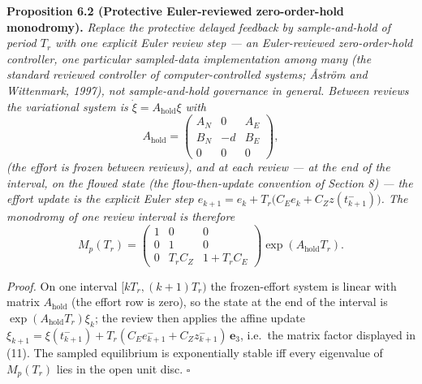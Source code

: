 \documentclass[11pt]{article}
\begin{document}
\textbf{Proposition 6.2 (Protective Euler-reviewed zero-order-hold
monodromy).} \emph{Replace the protective delayed feedback by
sample-and-hold of period \(T_r\) with one explicit Euler review step
--- an Euler-reviewed zero-order-hold controller, one particular
sampled-data implementation among many (the standard reviewed controller
of computer-controlled systems; \AA{}str\"om and Wittenmark, 1997), not
sample-and-hold governance in general. Between reviews the variational
system is \(\dot\xi = A_{\mathrm{hold}}\xi\) with}
\[A_{\mathrm{hold}} = \begin{pmatrix} A_N & 0 & A_E \\ B_N & -d & B_E \\ 0 & 0 & 0 \end{pmatrix},\]
\emph{(the effort is frozen between reviews), and at each review --- at
the end of the interval, on the flowed state (the flow-then-update
convention of Section 8) --- the effort update is the explicit Euler
step \(e_{k+1} = e_k + T_r\big(C_E e_k + C_Z z(t_{k+1}^-)\big)\). The
monodromy of one review interval is therefore}
\[M_p(T_r) = \begin{pmatrix} 1 & 0 & 0 \\ 0 & 1 & 0 \\ 0 & T_r C_Z & 1 + T_r C_E \end{pmatrix} \exp(A_{\mathrm{hold}} T_r). \tag{11}\]

\emph{Proof.} On one interval \([kT_r, (k+1)T_r)\) the frozen-effort
system is linear with matrix \(A_{\mathrm{hold}}\) (the effort row is
zero), so the state at the end of the interval is
\(\exp(A_{\mathrm{hold}}T_r)\xi_k\); the review then applies the affine
update
\(\xi_{k+1} = \xi(t_{k+1}^-) + T_r(C_E e_{k+1}^- + C_Z z_{k+1}^-)\,\mathbf{e}_3\),
i.e.~the matrix factor displayed in (11). The sampled equilibrium is
exponentially stable iff every eigenvalue of \(M_p(T_r)\) lies in the
open unit disc. \ensuremath{\square}
\end{document}
